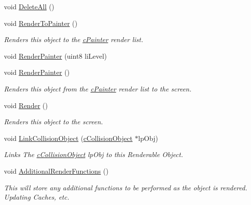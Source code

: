 \begin{DoxyCompactItemize}
\item 
void \hyperlink{classc_render_node_ae25bf3a5d2242ea5b88d6c409b14a02b}{DeleteAll} ()
\item 
void \hyperlink{classc_render_node_aa1a1cf0616c7fd30e95e2712ebd4c59c}{RenderToPainter} ()
\begin{DoxyCompactList}\small\item\em Renders this object to the \hyperlink{classc_painter}{cPainter} render list. \item\end{DoxyCompactList}\item 
void \hyperlink{classc_render_node_a0f262c31fb58313c36b7f3cde7228516}{RenderPainter} (uint8 liLevel)
\item 
void \hyperlink{classc_render_node_a56a964f97aeae5419f1b1f599948dc81}{RenderPainter} ()
\begin{DoxyCompactList}\small\item\em Renders this object from the \hyperlink{classc_painter}{cPainter} render list to the screen. \item\end{DoxyCompactList}\item 
void \hyperlink{classc_render_node_ab821e33b9286dd661f3dec143966f8b8}{Render} ()
\begin{DoxyCompactList}\small\item\em Renders this object to the screen. \item\end{DoxyCompactList}\item 
void \hyperlink{classc_render_node_a6cd00cebef1668356808ad0de77bcd19}{LinkCollisionObject} (\hyperlink{classc_collision_object}{cCollisionObject} $\ast$lpObj)
\begin{DoxyCompactList}\small\item\em Links The \hyperlink{classc_collision_object}{cCollisionObject} lpObj to this Renderable Object. \item\end{DoxyCompactList}\item 
void \hyperlink{classc_render_node_a6b0c65b32abdf6046dbe3f2c8d24cfaf}{AdditionalRenderFunctions} ()
\begin{DoxyCompactList}\small\item\em This will store any additional functions to be performed as the object is rendered. Updating Caches, etc. \item\end{DoxyCompactList}\item 

\end{DoxyCompactItemize}

